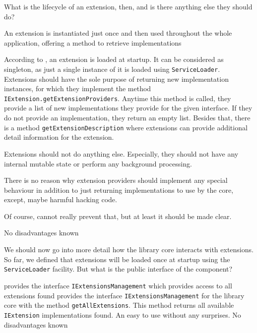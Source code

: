 What is the lifecycle of an extension, then, and is there anything else they should do?

{%
An extension is instantiated just once and then used throughout the whole application, offering a method to retrieve implementations
}
{%
According to , an extension is loaded at \LibName{} startup. It can be considered as singleton, as just a single instance of it is loaded using \texttt{ServiceLoader}. Extensions should have the sole purpose of returning new implementation instances, for which they implement the method \texttt{IExtension.getExtensionProviders}. Anytime this method is called, they provide a list of new implementations they provide for the given interface. If they do not provide an implementation, they return an empty list. Besides that, there is a method \texttt{getExtensionDescription} where extensions can provide additional detail information for the extension.

Extensions should not do anything else. Especially, they should not have any internal mutable state or perform any background processing.
}
{%
There is no reason why extension providers should implement any special behaviour in addition to just returning implementations to use by the core, except, maybe harmful hacking code.

Of course, \LibName{} cannot really prevent that, but at least it should be made clear.
}
{%
No disadvantages known
}

We should now go into more detail how the library core interacts with extensions. So far, we defined that extensions will be loaded once at startup using the \texttt{ServiceLoader} facility. But what is the public interface of the \COMPextensionManagement{} component?

{%
\COMPextensionManagement{} provides the interface \texttt{IExtensionsManagement} which provides access to all extensions found
}
{%
\COMPextensionManagement{} provides the interface \texttt{IExtensionsManagement} for the library core with the method \texttt{getAllExtensions}. This method returns all available \texttt{IExtension} implementations found.
}
{%
An easy to use \COMPextensionManagement{} without any surprises.
}
{%
No disadvantages known
}


%
%


